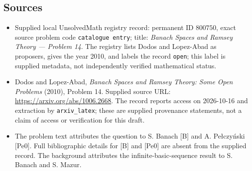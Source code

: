 \documentclass[11pt]{article}
\begin{document}
\subsection{Sources}
\begin{itemize}
\item Supplied local UnsolvedMath registry record: permanent ID \(800750\), exact source problem code \texttt{catalogue entry}; title: \emph{Banach Spaces and Ramsey Theory --- Problem 14}. The registry lists Dodos and Lopez-Abad as proposers, gives the year 2010, and labels the record \texttt{open}; this label is supplied metadata, not independently verified mathematical status.
\item Dodos and Lopez-Abad, \emph{Banach Spaces and Ramsey Theory: Some Open Problems} (2010), Problem 14. Supplied source URL: \url{https://arxiv.org/abs/1006.2668}. The record reports access on 2026-10-16 and extraction by \texttt{arxiv\_latex}; these are supplied provenance statements, not a claim of access or verification for this draft.
\item The problem text attributes the question to S. Banach [B] and A. Pe{\l}czy\'{n}ski [Pe0]. Full bibliographic details for [B] and [Pe0] are absent from the supplied record. The background attributes the infinite-basic-sequence result to S. Banach and S. Mazur.
\end{itemize}
\end{document}
